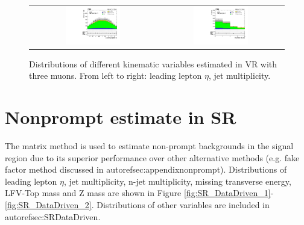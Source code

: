 \begin{figure}[tbh!]
 \begin{center}
 \begin{tabular}{cc}
   \includegraphics[width=0.45\textwidth]{figures/Part3/Nonprompt/VR/mumumu/lep1Eta}&
 \includegraphics[width=0.45\textwidth]{figures/Part3/Nonprompt/VR/mumumu/njet} \\
 \end{tabular}
 \caption{Distributions of different kinematic variables estimated in VR with three muons. From left to right: leading lepton $\eta$, jet multiplicity.}
 \label{fig:VR_matrix_mumumu}
 \end{center}
\end{figure}
\section{Nonprompt estimate in SR}
\label{sec:MMSR}

The matrix method is used to estimate non-prompt backgrounds in the signal region due to its superior performance over other alternative methods (e.g. fake factor method discussed in autoref{sec:appendixnonprompt}). Distributions of leading lepton $\eta$, jet multiplicity, n-jet multiplicity, missing transverse energy, LFV-Top mass and Z mass are shown in Figure \ref{fig:SR_DataDriven_1}-\ref{fig:SR_DataDriven_2}. Distributions of other variables are included in autoref{sec:SRDataDriven}.

